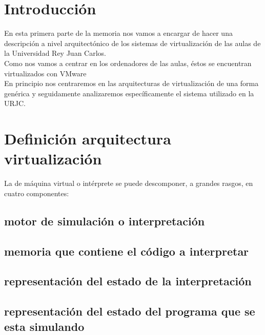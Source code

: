 \chapter{Introducción}
\lettrine[lines=1,slope=4pt,findent=0pt]{E}{}n esta primera parte de la memoria nos vamos a encargar de hacer una descripción a nivel arquitectónico de los sistemas de virtualización de las aulas de la Universidad Rey Juan Carlos.\\

\noindent Como nos vamos a centrar en los ordenadores de las aulas, éstos se encuentran virtualizados con VMware~\cite{vmware}\\

\noindent En principio nos centraremos en las arquitecturas de virtualización de una forma genérica y seguidamente analizaremos específicamente el sistema utilizado en la URJC.


\chapter{Definición arquitectura virtualización}

\lettrine[lines=1,slope=4pt,findent=0pt]{L}{}a de máquina virtual o intérprete se puede descomponer, a grandes rasgos, en cuatro componentes:
\section{motor de simulación o interpretación}
\section{memoria que contiene el código a interpretar}
\section{representación del estado de la interpretación}
\section{representación del estado del programa que se esta
simulando}
